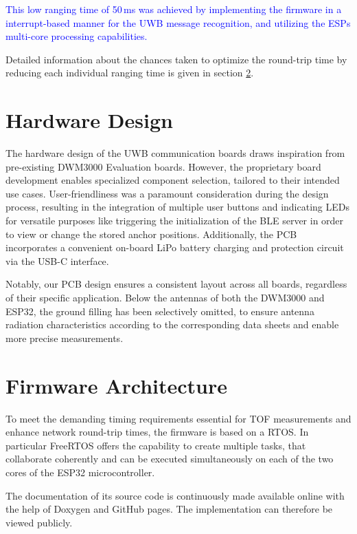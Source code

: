 \documentclass[conference, a4paper]{IEEEtran}
\begin{document}
\textcolor{blue}{
This low ranging time of 50\,ms was achieved by implementing the firmware in a interrupt-based manner for the \ac{UWB} message recognition, and utilizing the ESPs multi-core processing capabilities.
}

Detailed information about the chances taken to optimize the round-trip time by reducing each individual ranging time
is given in section \ref{section:firmware}.


\section{Hardware Design}\label{section:hardware}
The hardware design of the \ac{UWB} communication boards draws inspiration from pre-existing DWM3000 Evaluation
boards.
However, the proprietary board development enables specialized component selection, tailored to their intended use cases.
User-friendliness was a paramount consideration during the design process,
resulting in the integration of multiple user buttons and indicating LEDs for versatile purposes like triggering the initialization of the \ac{BLE} server in order to view or change the stored anchor positions. 
Additionally, the PCB incorporates a convenient on-board LiPo battery charging and protection circuit via the USB-C interface.

Notably, our PCB design ensures a consistent layout across all boards, regardless of their specific application.
Below the antennas of both the DWM3000 and ESP32, the ground filling has been selectively omitted, to ensure antenna radiation characteristics according to the corresponding data sheets and enable more precise measurements.

\section{Firmware Architecture}\label{section:firmware}
To meet the demanding timing requirements essential for \ac{TOF} measurements and enhance network round-trip times,
the firmware is based on a \ac{RTOS}.
In particular FreeRTOS \cite{FreeRTOS_2023} offers the capability to create multiple tasks, that collaborate coherently and can be executed simultaneously on each of the two cores of the ESP32 microcontroller.

The documentation of its source code is continuously made available online with the help of Doxygen and GitHub pages.
The implementation can therefore be viewed publicly\cite{doxygen-doku}.
\end{document}
